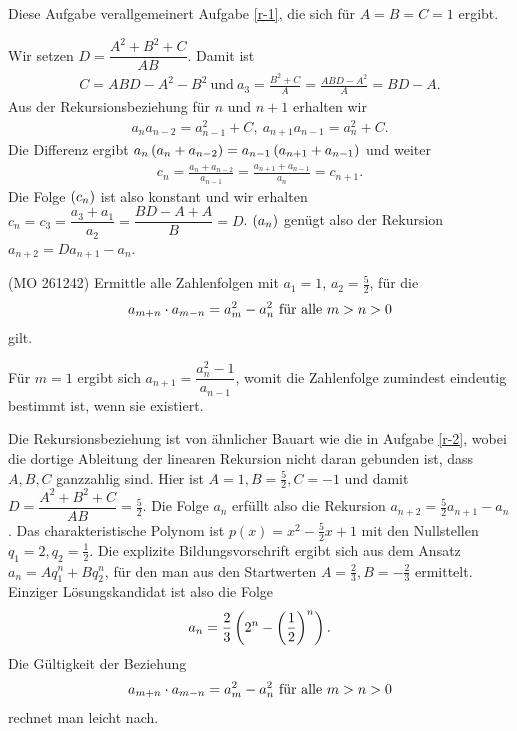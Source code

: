 \documentclass[11pt,a4paper]{article}
\begin{document}
\begin{loesung}
  Diese Aufgabe verallgemeinert Aufgabe \ref{r-1}, die sich für $A=B=C=1$
  ergibt.

Wir setzen $D=\dfrac{A^2+B^2+C}{AB}$. Damit ist 
\begin{gather*}
  C=ABD-A^2-B^2\ \text{und}\ a_3=\frac{B^2+C}{A}=\frac{ABD-A^2}{A}=BD-A.
\end{gather*}
Aus der Rekursionsbeziehung für $n$ und $n+1$ erhalten wir
\begin{gather*}
  a_na_{n-2}=a_{n-1}^2+C,\ a_{n+1}a_{n-1}=a_n^2+C.
\end{gather*}
Die Differenz ergibt $a_n\left(a_n+a_{n-2}\right)=a_{n-1}\left(a_{n+1}+a_{n-1}\right)$ und
weiter 
\begin{gather*}
  c_n=\frac{a_n+a_{n-2}}{a_{n-1}}=\frac{a_{n+1}+a_{n-1}}{a_n}=c_{n+1}.
\end{gather*}
Die Folge $\left(c_n\right)$ ist also konstant und wir erhalten
$c_n=c_3=\dfrac{a_3+a_1}{a_2}=\dfrac{BD-A+A}{B}=D$.  $\left(a_n\right)$ genügt also
der Rekursion $a_{n+2}=Da_{n+1}-a_n$.
\end{loesung}

\begin{aufgabe} (MO 261242)
  Ermittle alle Zahlenfolgen mit $a_1=1$, $a_2=\frac52$, für die
  \begin{gather*}
    a_{m+n}\cdot a_{m-n}=a_m^2-a_n^2\ \text{für alle}\ m>n>0
  \end{gather*}
  gilt.
\end{aufgabe}
\begin{loesung}
  Für $m=1$ ergibt sich $a_{n+1}=\dfrac{a_n^2-1}{a_{n-1}}$, womit die
  Zahlenfolge zumindest eindeutig bestimmt ist, wenn sie existiert.

  Die Rekursionsbeziehung ist von ähnlicher Bauart wie die in Aufgabe
  \ref{r-2}, wobei die dortige Ableitung der linearen Rekursion nicht daran
  gebunden ist, dass $A,B,C$ ganzzahlig sind.  Hier ist $A=1, B=\frac52, C=-1$
  und damit $D=\dfrac{A^2+B^2+C}{AB}=\frac52$.  Die Folge $a_n$ erfüllt also
  die Rekursion $a_{n+2}=\frac52a_{n+1}-a_n$.  Das charakteristische Polynom
  ist $p(x)=x^2-\frac52x+1$ mit den Nullstellen $q_1=2, q_2=\frac12$.  Die
  explizite Bildungsvorschrift ergibt sich aus dem Ansatz $a_n=Aq_1^n+Bq_2^n$,
  für den man aus den Startwerten $A=\frac23, B=-\frac23$ ermittelt. Einziger
  Lösungskandidat ist also die Folge
  \begin{gather*}
    a_n=\frac23\left(2^n-\left(\frac12\right)^n\right).
  \end{gather*}
  Die Gültigkeit der Beziehung
  \begin{gather*}
    a_{m+n}\cdot a_{m-n}=a_m^2-a_n^2\ \text{für alle}\ m>n>0
  \end{gather*}
  rechnet man leicht nach.
\end{loesung}
\end{document}
